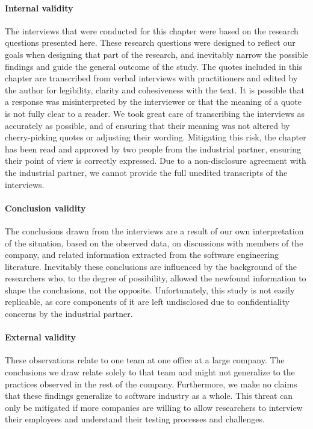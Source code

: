 \paragraph{Internal validity} 
The interviews that were conducted for this chapter were based on the research questions presented here.
These research questions were designed to reflect our goals when designing that part of the research, and inevitably narrow the possible findings and guide the general outcome of the study.
The quotes included in this chapter are transcribed from verbal interviews with practitioners and edited by the author for legibility, clarity and cohesiveness with the text.
It is possible that a response was misinterpreted by the interviewer or that the meaning of a quote is not fully clear to a reader.
We took great care of transcribing the interviews as accurately as possible, and of ensuring that their meaning was not altered by cherry-picking quotes or adjusting their wording.
Mitigating this risk, the chapter has been read and approved by two people from the industrial partner, ensuring their point of view is correctly expressed.
Due to a non-disclosure agreement with the industrial partner, we cannot provide the full unedited transcripts of the interviews.

\paragraph{Conclusion validity}
The conclusions drawn from the interviews are a result of our own interpretation of the situation, based on the observed data, on discussions with members of the company, and related information extracted from the software engineering literature.
Inevitably these conclusions are influenced by the background of the researchers who, to the degree of possibility, allowed the newfound information to shape the conclusions, not the opposite.
Unfortunately, this study is not easily replicable, as core components of it are left undisclosed due to confidentiality concerns by the industrial partner. 

\paragraph{External validity}
These observations relate to one team at one office at a large company.
The conclusions we draw relate solely to that team and might not generalize to the practices observed in the rest of the company.
Furthermore, we make no claims that these findings generalize to software industry as a whole.
This threat can only be mitigated if more companies are willing to allow researchers to interview their employees and understand their testing processes and challenges.

